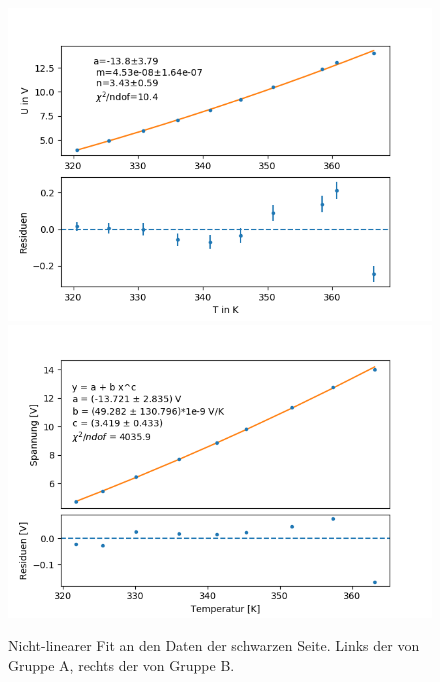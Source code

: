 \documentclass[12pt,a4paper]{article}
\begin{document}
\begin{figure}[H]
\centering
\includegraphics[scale=0.5]{Bilder/nichtlinear_A_schwarz.png}
\includegraphics[scale=0.5]{Bilder/nonlinear_schwarz_B.png}
\caption{Nicht-linearer Fit an den Daten der schwarzen Seite. Links der von Gruppe A, rechts der von Gruppe B.}
\end{figure}
	
\end{document}
